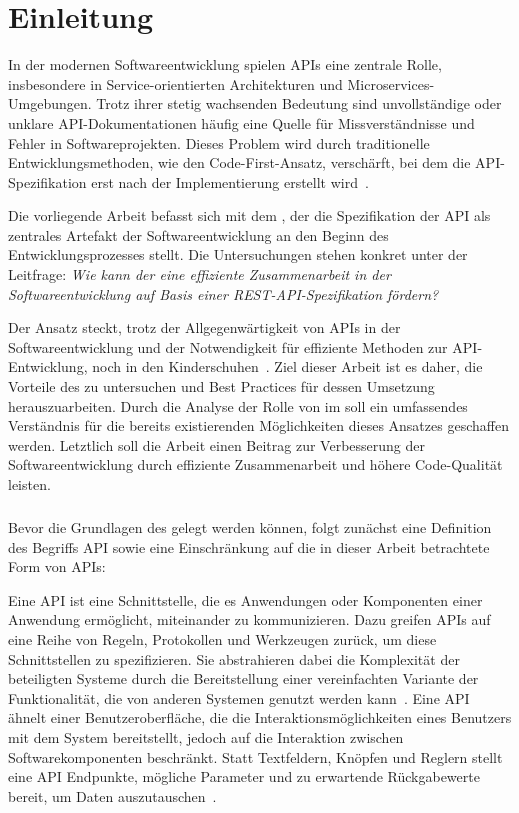 \chapter{Einleitung}
\label{ch:introduction}
In der modernen Softwareentwicklung spielen \acp{API} eine zentrale Rolle, insbesondere in Service-orientierten Architekturen und Microservices-Umgebungen.
Trotz ihrer stetig wachsenden Bedeutung sind unvollständige oder unklare \ac{API}-Dokumentationen häufig eine Quelle für Missverständnisse und Fehler in Softwareprojekten.
Dieses Problem wird durch traditionelle Entwicklungsmethoden, wie den Code-First-Ansatz, verschärft, bei dem die \ac{API}-Spezifikation erst nach der Implementierung erstellt wird~\cite[73]{bea22}.

Die vorliegende Arbeit befasst sich mit dem \AFA, der die Spezifikation der \ac{API} als zentrales Artefakt der Softwareentwicklung an den Beginn des Entwicklungsprozesses stellt.
Die Untersuchungen stehen konkret unter der Leitfrage: \emph{Wie kann der \AFA eine effiziente Zusammenarbeit in der Softwareentwicklung auf Basis einer \acs{REST}-\acs{API}-Spezifikation fördern?}

Der Ansatz steckt, trotz der Allgegenwärtigkeit von \acp{API} in der Softwareentwicklung und der Notwendigkeit für effiziente Methoden zur \ac{API}-Entwicklung, noch in den Kinderschuhen~\cite[78]{bea22}.
Ziel dieser Arbeit ist es daher, die Vorteile des \AFAes zu untersuchen und Best Practices für dessen Umsetzung herauszuarbeiten.
Durch die Analyse der Rolle von \OA im \AFA soll ein umfassendes Verständnis für die bereits existierenden Möglichkeiten dieses Ansatzes geschaffen werden.
Letztlich soll die Arbeit einen Beitrag zur Verbesserung der Softwareentwicklung durch effiziente Zusammenarbeit und höhere Code-Qualität leisten.

\paragraph{}
Bevor die Grundlagen des \AFAes gelegt werden können, folgt zunächst eine Definition des Begriffs \acf{API} sowie eine Einschränkung auf die in dieser Arbeit betrachtete Form von \acp{API}:

Eine \ac{API} ist eine Schnittstelle, die es Anwendungen oder Komponenten einer Anwendung ermöglicht, miteinander zu kommunizieren.
Dazu greifen \acp{API} auf eine Reihe von Regeln, Protokollen und Werkzeugen zurück, um diese Schnittstellen zu spezifizieren.
Sie abstrahieren dabei die Komplexität der beteiligten Systeme durch die Bereitstellung einer vereinfachten Variante der Funktionalität, die von anderen Systemen genutzt werden kann~\cite[1]{kul23}.
Eine \ac{API} ähnelt einer Benutzeroberfläche, die die Interaktionsmöglichkeiten eines Benutzers mit dem System bereitstellt, jedoch auf die Interaktion zwischen Softwarekomponenten beschränkt.
Statt Textfeldern, Knöpfen und Reglern stellt eine \ac{API} Endpunkte, mögliche Parameter und zu erwartende Rückgabewerte bereit, um Daten auszutauschen~\cites[351]{de23}{ope23a}.

